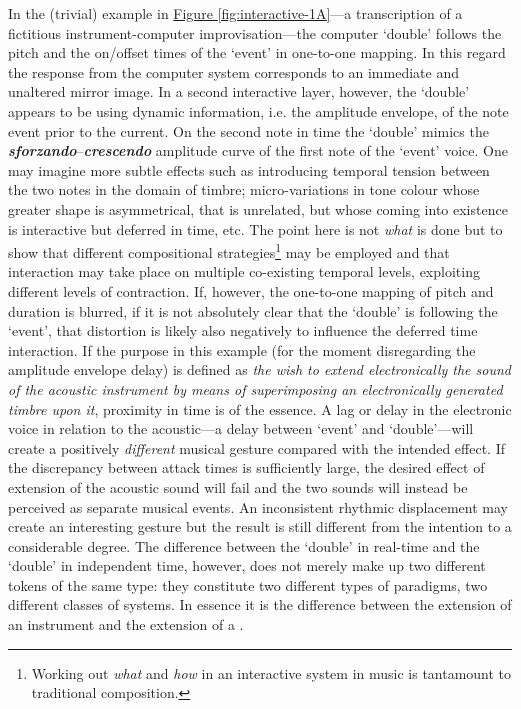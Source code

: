 In the (trivial) example in \hyperref[fig:interactive-1A]{Figure \ref*{fig:interactive-1A}}---a transcription of a fictitious instrument-computer improvisation---the computer `double' follows the pitch and the on/offset times of the `event' in one-to-one mapping. In this regard the response from the computer system corresponds to an immediate and unaltered mirror image. In a second interactive layer, however, the `double' appears to be using dynamic information, i.e. the amplitude envelope, of the note event prior to the current. On the second note in time the `double' mimics the \emph{\textbf{sforzando}}--\emph{\textbf{crescendo}} amplitude curve of the first note of the `event' voice. One may imagine more subtle effects such as introducing temporal tension between the two notes in the domain of timbre; micro-variations in tone colour whose greater shape is asymmetrical, that is unrelated, but whose coming into existence is interactive but deferred in time, etc. The point here is not \emph{what} is done but to show that different compositional strategies\footnote{Working out \emph{what} and \emph{how} in an interactive system in music is tantamount to traditional composition.} may be employed and that interaction may take place on multiple co-existing temporal levels, exploiting different levels of contraction. If, however, the one-to-one mapping of pitch and duration is blurred, if it is not absolutely clear that the `double' is following the `event', that distortion is likely also negatively to influence the deferred time interaction.\label{par:label:human-comp-inter:9} \hypertarget{par:human-comp-inter:9}{If the purpose} in this example (for the moment disregarding the amplitude envelope delay) is defined as \emph{the wish to extend electronically the sound of the acoustic instrument by means of superimposing an electronically generated timbre upon it}, proximity in time is of the essence. A lag or delay in the electronic voice in relation to the acoustic---a delay between `event' and `double'---will create a positively \emph{different} musical gesture compared with the intended effect. If the discrepancy between attack times is sufficiently large, the desired effect of extension of the acoustic sound will fail and the two sounds will instead be perceived as separate musical events. An inconsistent rhythmic displacement may create an interesting gesture but the result is still different from the intention to a considerable degree. The difference between the `double' in real-time and the `double' in independent time, however, does not merely make up two different tokens of the same type: they constitute two different types of paradigms, two different classes of systems. In essence it is the difference between the extension of an instrument and the extension of a .

